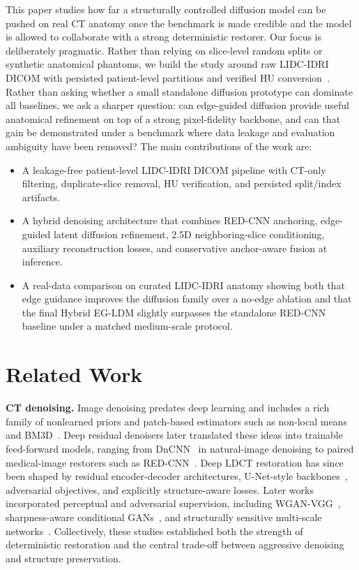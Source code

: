 \documentclass{article}
\newcommand{\hybrid}{Hybrid EG-LDM}
\begin{document}
This paper studies how far a structurally controlled diffusion model can be pushed on real CT anatomy once the benchmark is made credible and the model is allowed to collaborate with a strong deterministic restorer. Our focus is deliberately pragmatic. Rather than relying on slice-level random splits or synthetic anatomical phantoms, we build the study around raw LIDC-IDRI DICOM with persisted patient-level partitions and verified HU conversion~\cite{armato2011}. Rather than asking whether a small standalone diffusion prototype can dominate all baselines, we ask a sharper question: can edge-guided diffusion provide useful anatomical refinement on top of a strong pixel-fidelity backbone, and can that gain be demonstrated under a benchmark where data leakage and evaluation ambiguity have been removed? The main contributions of the work are:
\begin{itemize}
    \item A leakage-free patient-level LIDC-IDRI DICOM pipeline with CT-only filtering, duplicate-slice removal, HU verification, and persisted split/index artifacts.
    \item A hybrid denoising architecture that combines RED-CNN anchoring, edge-guided latent diffusion refinement, 2.5D neighboring-slice conditioning, auxiliary reconstruction losses, and conservative anchor-aware fusion at inference.
    \item A real-data comparison on curated LIDC-IDRI anatomy showing both that edge guidance improves the diffusion family over a no-edge ablation and that the final \hybrid{} slightly surpasses the standalone RED-CNN baseline under a matched medium-scale protocol.
\end{itemize}

\section{Related Work}
\textbf{CT denoising.}
Image denoising predates deep learning and includes a rich family of nonlearned priors and patch-based estimators such as non-local means and BM3D~\cite{buades2011,dabov2007}. Deep residual denoisers later translated these ideas into trainable feed-forward models, ranging from DnCNN~\cite{zhang2017dncnn} in natural-image denoising to paired medical-image restorers such as RED-CNN~\cite{chen2017}. Deep LDCT restoration has since been shaped by residual encoder-decoder architectures, U-Net-style backbones~\cite{ronneberger2015}, adversarial objectives, and explicitly structure-aware losses. Later works incorporated perceptual and adversarial supervision, including WGAN-VGG~\cite{yang2018}, sharpness-aware conditional GANs~\cite{yi2018}, and structurally sensitive multi-scale networks~\cite{you2018}. Collectively, these studies established both the strength of deterministic restoration and the central trade-off between aggressive denoising and structure preservation.
\end{document}
